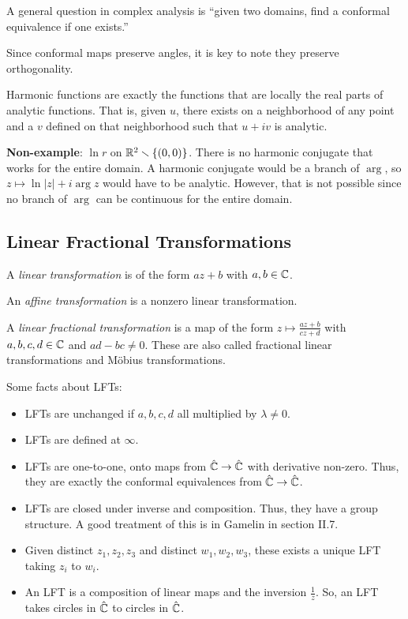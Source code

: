 \documentclass[11pt,leqno,oneside]{amsart}
\begin{document}
A general question in complex analysis is ``given two domains, find a conformal
equivalence if one exists.''

Since conformal maps preserve angles, it is key to note they preserve
orthogonality.

\begin{rmk}
  Harmonic functions are exactly the functions that are locally the real parts
  of analytic functions. That is, given $u$, there exists on a neighborhood of
  any point and a $v$ defined on that neighborhood such that $u+iv$ is
  analytic.
\end{rmk}

\begin{example}
  \textbf{Non-example}: $\ln r$ on ${\mathbb R}^2 \smallsetminus \{(0,0)\}$. There is no
  harmonic conjugate that works for the entire domain. A harmonic conjugate
  would be a branch of $\arg$, so $z \mapsto \ln|z|+i\arg z$ would have to be
  analytic. However, that is not possible since no branch of $\arg$ can be
  continuous for the entire domain.
\end{example}

\subsection{Linear Fractional Transformations}
\begin{defn}
    A \emph{linear transformation} is of the form $az + b$ with $a,b \in {\mathbb C}$.
\end{defn}
\begin{defn}
    An \emph{affine transformation} is a nonzero linear transformation.
\end{defn}
\begin{defn}
    A \emph{linear fractional transformation} is a map of the form $z \mapsto
    \frac{az+b}{cz+d}$ with $a,b,c,d \in {\mathbb C}$ and $ad-bc \neq 0$. These are also
    called fractional linear transformations and M{\"o}bius transformations.
  \end{defn}

  Some facts about LFTs:
  \begin{itemize}
  \item LFTs are unchanged if $a,b,c,d$ all multiplied by $\lambda \neq 0$.
  \item LFTs are defined at $\infty$.
  \item LFTs are one-to-one, onto maps from $\hat{{\mathbb C}} \to \hat{{\mathbb C}}$ with
    derivative non-zero. Thus, they are exactly the conformal equivalences from
    $\hat{{\mathbb C}} \to \hat{{\mathbb C}}$.
  \item LFTs are closed under inverse and composition. Thus, they have a group
    structure. A good treatment of this is in Gamelin in section II.7.
  \item Given distinct $z_1,z_2,z_3$ and distinct $w_1,w_2,w_3$, these exists a
    unique LFT taking $z_i$ to $w_i$.
    \item An LFT is a composition of linear maps and the inversion
      $\frac{1}{z}$. So, an LFT takes circles in $\hat{{\mathbb C}}$ to circles in
      $\hat{{\mathbb C}}$.
  \end{itemize}
\end{document}
